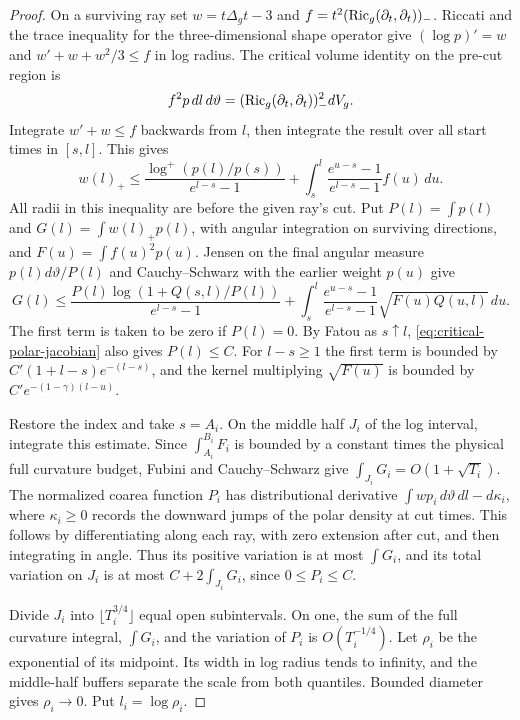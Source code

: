 \begin{proof}
On a surviving ray set
\(w=t\Delta_g t-3\) and
\(f=t^2(\operatorname{Ric}_g(\partial_t,\partial_t))_-\).
Riccati and the trace inequality for the three-dimensional
shape operator give \((\log p)'=w\) and
\(w'+w+w^2/3\le f\) in log radius. The critical volume
identity on the pre-cut region is
\[
 f^2p\,dl\,d\vartheta=(\operatorname{Ric}_g(\partial_t,\partial_t))_-^2dV_g .
\]
Integrate \(w'+w\le f\) backwards from \(l\), then
integrate the result over all start times in \([s,l]\). This gives
\[
 w(l)_+\le
 \frac{\log^+(p(l)/p(s))}{e^{l-s}-1}
 +\int_s^l\frac{e^{u-s}-1}{e^{l-s}-1}f(u)\,du .
\]
All radii in this inequality are before the given ray's cut.
Put \(P(l)=\int p(l)\) and \(G(l)=\int w(l)_+p(l)\), with
angular integration on surviving directions, and
\(F(u)=\int f(u)^2p(u)\). Jensen on the final angular
measure \(p(l)d\vartheta/P(l)\) and Cauchy--Schwarz with the
earlier weight \(p(u)\) give
\[
 G(l)\le
 \frac{P(l)\log(1+Q(s,l)/P(l))}{e^{l-s}-1}
 +\int_s^l
   \frac{e^{u-s}-1}{e^{l-s}-1}\sqrt{F(u)Q(u,l)}\,du .
\]
The first term is taken to be zero if \(P(l)=0\).
By Fatou as \(s\uparrow l\), \eqref{eq:critical-polar-jacobian}
also gives \(P(l)\le C\). For \(l-s\ge1\) the first term is
bounded by \(C'(1+l-s)e^{-(l-s)}\), and the kernel multiplying
\(\sqrt{F(u)}\) is bounded by \(C'e^{-(1-\gamma)(l-u)}\).

Restore the index and take \(s=A_i\). On the middle half
\(J_i\) of the log interval, integrate this estimate. Since
\(\int_{A_i}^{B_i}F_i\) is bounded by a constant times the
physical full curvature budget, Fubini and Cauchy--Schwarz
give \(\int_{J_i}G_i=O(1+\sqrt{T_i})\).
The normalized coarea function \(P_i\) has distributional
derivative \(\int w p_i\,d\vartheta\,dl-d\kappa_i\), where
\(\kappa_i\ge0\) records the downward jumps of the polar
density at cut times. This follows by differentiating
along each ray, with zero extension after cut, and then
integrating in angle. Thus its positive variation is
at most \(\int G_i\), and its total variation on \(J_i\)
is at most \(C+2\int_{J_i}G_i\), since \(0\le P_i\le C\).

Divide \(J_i\) into \(\lfloor T_i^{3/4}\rfloor\) equal
open subintervals. On one, the sum of the full curvature
integral, \(\int G_i\), and the variation of \(P_i\)
is \(O(T_i^{-1/4})\). Let \(\rho_i\) be the exponential
of its midpoint. Its width in log radius tends to
infinity, and the middle-half buffers separate the
scale from both quantiles. Bounded diameter gives
\(\rho_i\to0\). Put \(l_i=\log\rho_i\).


\end{proof}
